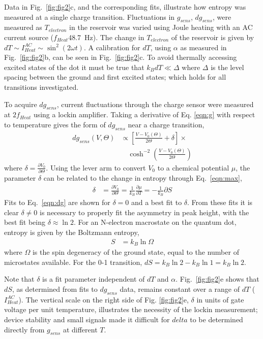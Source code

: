 \documentclass[twocolumn,showpacs,preprintnumbers,amsmath,amssymb,pra,aps,superscriptaddress]{revtex4-1}
\begin{document}
Data in Fig.~\ref{fig:fig2}c, and the corresponding fits, illustrate how entropy was measured at a single charge transition. Fluctuations in $g_{sens}$, $dg_{sens}$, were measured as $T_{electron}$ in the reservoir was varied using Joule heating with an AC current source ($f_{Heat}$\SI{48.7}{\hertz}). The change in $T_{electron}$ of the reservoir is given by $dT \sim I^{AC}_{Heat} \sim \sin^2(2\omega t)$. A calibration for $dT$, using $\alpha$ as measured in Fig.~\ref{fig:fig2}b, can be seen in Fig.~\ref{fig:fig2}c. To avoid thermally accessing excited states of the dot it must be true that $k_B dT \ll \Delta$ where $\Delta$ is the level spacing between the ground and first excited states; which holds for all transitions investigated. 

To acquire $dg_{sens}$, current fluctuations through the charge sensor were measured at $2f_{Heat}$ using a lockin amplifier. Taking a derivative of Eq. \ref{eqn:g} with respect to temperature gives the form of $dg_{sens}$ near a charge transition,
%
\begin{align}
\label{eqn:dg}
        dg_{sens}(V, \Theta) &\propto \left[ \frac{V-V_0(\Theta)}{2\Theta} + \delta \right]\times \\
        				      &\quad\cosh^{-2}\left(\frac{V-V_0(\Theta)}{2\Theta}\right) \nonumber
\end{align}
%
where $\delta=\frac{\partial V_0}{\partial \Theta}$. Using the lever arm to convert $V_0$ to a chemical potential $\mu$, the parameter $\delta$ can be related to the change in entropy through Eq.~\ref{eqn:max},
%
\begin{align}
\label{eqn:delta}
        \delta &= \frac{\partial V_0}{\partial \Theta} = 
        \frac{1}{k_B} \frac{\partial \mu}{\partial T} = 
        -\frac{1}{k_B} \partial S
\end{align}
%
Fits to Eq.~\ref{eqn:dg} are shown for $\delta=0$ and a best fit to $\delta$. From these fits it is clear $\delta\neq0$ is necessary to properly fit the asymmetry in peak height, with the best fit being $\delta \approx \ln{2}$. For an N-electron macrostate on the quantum dot, entropy is given by the Boltzmann entropy,
%
\begin{align}
\label{eqn:S}
        S &= k_B \ln{\Omega}
\end{align}
%
where $\Omega$ is the spin degeneracy of the ground state, equal to the number of microstates available. For the 0-1 transition, $dS =  k_B\ln{2} - k_B \ln{1} = k_B\ln{2}$.

Note that $\delta$ is a fit parameter independent of $dT$ and $\alpha$. Fig.~\ref{fig:fig2}e shows that $dS$, as determined from fits to $dg_{sens}$ data, remains constant over a range of $dT$ ($I^{AC}_{Heat}$). The vertical scale on the right side of Fig. \ref{fig:fig2}e, $\delta$ in units of gate voltage per unit temperature, illustrates the necessity of the lockin measurement; device stability and small signals made it difficult for $delta$ to be determined directly from $g_{sens}$ at different $T$.
\end{document}
